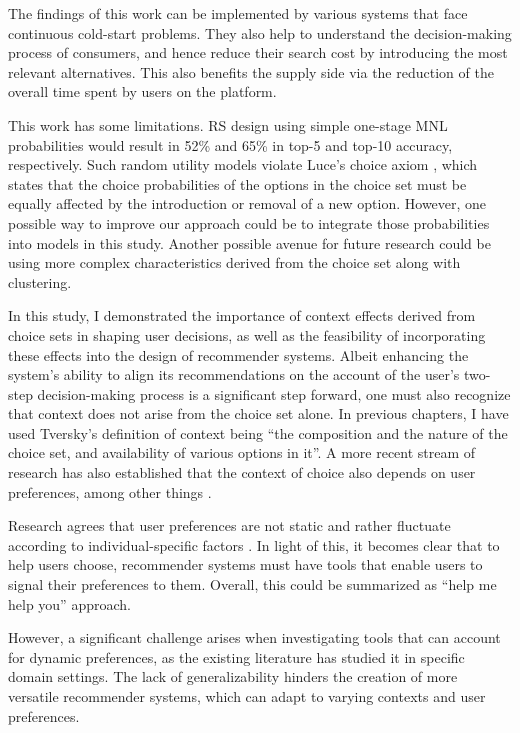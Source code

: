 \documentclass[a4paper,12pt]{article}
\newcommand{\citeyearonly}[1]{\citeyearpar{#1}}
\begin{document}
The findings of this work can be implemented by various systems that face continuous cold-start problems. They also help to understand the decision-making process of consumers, and hence reduce their search cost by introducing the most relevant alternatives. This also benefits the supply side via the reduction of the overall time spent by users on the platform.

This work has some limitations. RS design using simple one-stage MNL probabilities would result in 52\% and 65\% in top-5 and top-10 accuracy, respectively. Such random utility models violate Luce's choice axiom \citep{luce59}, which states that the choice probabilities of the options in the choice set must be equally affected by the introduction or removal of a new option. However, one possible way to improve our approach could be to integrate those probabilities into models in this study. Another possible avenue for future research could be using more complex characteristics derived from the choice set along with clustering.


In this study, I demonstrated the importance of context effects derived from choice sets in shaping user decisions, as well as the feasibility of incorporating these effects into the design of recommender systems.
Albeit enhancing the system's ability to align its recommendations on the account of the user's two-step decision-making process is a significant step forward, one must also recognize that context does not arise from the choice set alone. In previous chapters, I have used Tversky's \citeyearonly{tversky1972elimination} definition of context being ``the composition and the nature of the choice set, and availability of various options in it''. A more recent stream of research has also established that the context of choice also depends on user preferences, among other things \citep{dey2001understanding, adomavicius2011context}.

Research agrees that user preferences are not static and rather fluctuate according to individual-specific factors \citep{songWhenHowDiversify2019}. In light of this, it becomes clear that to help users choose, recommender systems must have tools that enable users to signal their preferences to them. Overall, this could be summarized as ``help me help you'' approach.

However, a significant challenge arises when investigating tools that can account for dynamic preferences, as the existing literature has studied it in specific domain settings. The lack of generalizability hinders the creation of more versatile recommender systems, which can adapt to varying contexts and user preferences. 
\end{document}
